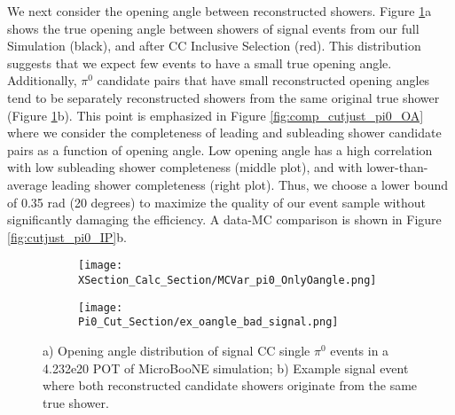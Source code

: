 \par We next consider the opening angle between reconstructed showers. Figure \ref{fig:mcvar_pi0_onlyoangle}a shows the true opening angle between showers of signal events from our full Simulation (black), and after CC Inclusive Selection (red). This distribution suggests that we expect few events to have a small true opening angle. Additionally, $\pi^0$ candidate pairs that have small reconstructed opening angles tend to be separately reconstructed showers from the same original true shower (Figure \ref{fig:mcvar_pi0_onlyoangle}b). This point is emphasized in Figure \ref{fig:comp_cutjust_pi0_OA} where we consider the completeness of leading and subleading shower candidate pairs as a function of opening angle. Low opening angle has a high correlation with low subleading shower completeness (middle plot), and with lower-than-average leading shower completeness (right plot). Thus, we choose a lower bound of 0.35 rad (20 degrees) to maximize the quality of our event sample without significantly damaging the efficiency. A data-MC comparison is shown in Figure \ref{fig:cutjust_pi0_IP}b. %


\begin{figure}[H]
\centering
  \begin{subfigure}[t]{0.35\textwidth}
    \centering
     \texttt{[image: XSection\_Calc\_Section/MCVar\_pi0\_OnlyOangle.png]}
     \caption{ }
  \end{subfigure} 
  \begin{subfigure}[t]{0.6\textwidth}
    \centering
    \texttt{[image: Pi0\_Cut\_Section/ex\_oangle\_bad\_signal.png]}
    \caption{ }
  \end{subfigure} 
  \caption{ a) Opening angle distribution of signal CC single $\pi^0$ events in a 4.232e20 POT of MicroBooNE simulation; b) Example signal event where both reconstructed candidate showers originate from the same true shower. }
\label{fig:mcvar_pi0_onlyoangle}
\end{figure}

